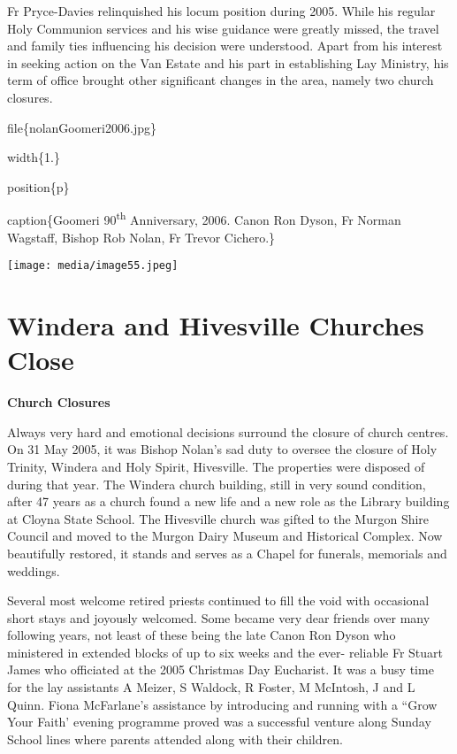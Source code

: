 Fr Pryce-Davies relinquished his locum position during 2005. While his regular Holy Communion services and his wise guidance were greatly missed, the travel and family ties influencing his decision were understood. Apart from his interest in seeking action on the Van Estate and his part in establishing Lay Ministry, his term of office brought other significant changes in the area, namely two church closures.

file\{nolanGoomeri2006.jpg\}

width\{1.\}

position\{p\}

caption\{Goomeri 90\textsuperscript{th} Anniversary, 2006. Canon Ron Dyson, Fr Norman Wagstaff, Bishop Rob Nolan, Fr Trevor Cichero.\}

\texttt{[image: media/image55.jpeg]}

\hypertarget{windera-and-hivesville-churches-close}{%
\section{Windera and Hivesville Churches Close}\label{windera-and-hivesville-churches-close}}

\textbf{Church Closures}

Always very hard and emotional decisions surround the closure of church centres. On 31 May 2005, it was Bishop Nolan's sad duty to oversee the closure of Holy Trinity, Windera and Holy Spirit, Hivesville. The properties were disposed of during that year. The Windera church building, still in very sound condition, after 47 years as a church found a new life and a new role as the Library building at Cloyna State School. The Hivesville church was gifted to the Murgon Shire Council and moved to the Murgon Dairy Museum and Historical Complex. Now beautifully restored, it stands and serves as a Chapel for funerals, memorials and weddings.

Several most welcome retired priests continued to fill the void with occasional short stays and joyously welcomed. Some became very dear friends over many following years, not least of these being the late Canon Ron Dyson who ministered in extended blocks of up to six weeks and the ever- reliable Fr Stuart James who officiated at the 2005 Christmas Day Eucharist. It was a busy time for the lay assistants A Meizer, S Waldock, R Foster, M McIntosh, J and L Quinn. Fiona McFarlane's assistance by introducing and running with a ``Grow Your Faith' evening programme proved was a successful venture along Sunday School lines where parents attended along with their children.

